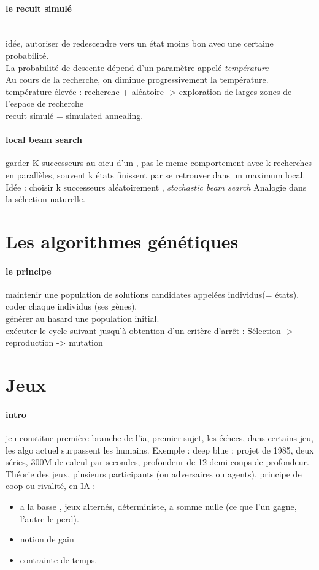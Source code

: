 \documentclass{article}
\begin{document}
\paragraph{le recuit simulé}\\ idée, autoriser de redescendre vers un état moins bon avec une certaine probabilité.\\ La probabilité de descente dépend d'un paramètre appelé \textit{température} \\Au cours de la recherche, on diminue progressivement la température.\\température élevée : recherche + aléatoire -> exploration de larges zones de l'espace de recherche\\recuit simulé = simulated annealing.

\paragraph{local beam search} garder K successeurs au oieu d'un , pas le meme comportement avec k recherches en parallèles, souvent k états finissent par se retrouver dans un maximum local. Idée : choisir k successeurs aléatoirement , \textit{stochastic beam search} Analogie dans la sélection naturelle. 

\section{Les algorithmes génétiques} 
\paragraph{le principe} maintenir une population de solutions candidates appelées individus(= états).\\coder chaque individus (ses gènes).\\générer au hasard une population initial.\\exécuter le cycle suivant jusqu’à obtention d'un critère d’arrêt : Sélection -> reproduction -> mutation

\section{Jeux}
\paragraph{intro} jeu constitue première branche de l'ia, premier sujet, les échecs, dans certains jeu, les algo actuel surpassent les humains. Exemple : deep blue : projet de 1985, deux séries, 300M de calcul par secondes, profondeur de 12 demi-coups de profondeur. Théorie des jeux, plusieurs participants (ou adversaires ou agents), principe de coop ou rivalité, en IA  : 
\begin{itemize}
\item a la basse , jeux alternés, déterministe, a somme nulle (ce que l'un gagne, l'autre le perd).
\item notion de gain 
\item contrainte de temps.
\end{itemize}
\end{document}
